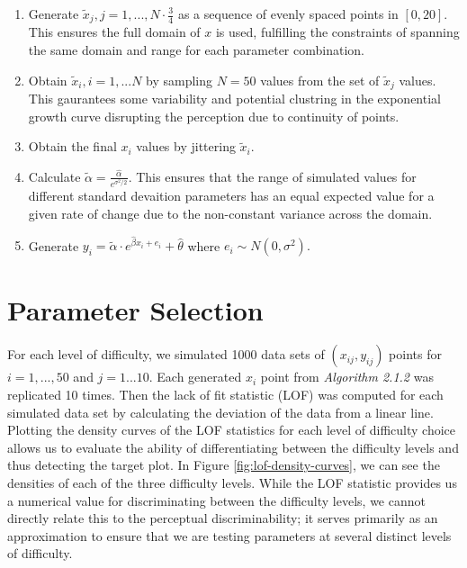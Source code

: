 \begin{appendix}
\begin{enumerate}
\def\labelenumi{\arabic{enumi}.}
\item
  Generate \(\tilde x_j, j = 1,..., N\cdot \frac{3}{4}\) as a sequence
  of evenly spaced points in \([0,20]\). This ensures the full domain of
  \(x\) is used, fulfilling the constraints of spanning the same domain
  and range for each parameter combination.
\item
  Obtain \(\tilde x_i, i = 1,...N\) by sampling \(N = 50\) values from
  the set of \(\tilde x_j\) values. This gaurantees some variability and
  potential clustring in the exponential growth curve disrupting the
  perception due to continuity of points.
\item
  Obtain the final \(x_i\) values by jittering \(\tilde x_i\).
\item
  Calculate \(\tilde\alpha = \frac{\hat\alpha}{e^{\sigma^2/2}}.\) This
  ensures that the range of simulated values for different standard
  devaition parameters has an equal expected value for a given rate of
  change due to the non-constant variance across the domain.
\item
  Generate
  \(y_i = \tilde\alpha\cdot e^{\hat\beta x_i + e_i}+\hat\theta\) where
  \(e_i\sim N(0,\sigma^2).\)
\end{enumerate}

\hypertarget{parameter-selection}{%
\section{\texorpdfstring{Parameter Selection
\label{app:parameters}}{Parameter Selection }}\label{parameter-selection}}

For each level of difficulty, we simulated 1000 data sets of
\((x_{ij}, y_{ij})\) points for \(i = 1,...,50\) and \(j = 1...10\).
Each generated \(x_i\) point from \textit{Algorithm 2.1.2} was
replicated 10 times. Then the lack of fit statistic (LOF) was computed
for each simulated data set by calculating the deviation of the data
from a linear line. Plotting the density curves of the LOF statistics
for each level of difficulty choice allows us to evaluate the ability of
differentiating between the difficulty levels and thus detecting the
target plot. In Figure \ref{fig:lof-density-curves}, we can see the
densities of each of the three difficulty levels. While the LOF
statistic provides us a numerical value for discriminating between the
difficulty levels, we cannot directly relate this to the perceptual
discriminability; it serves primarily as an approximation to ensure that
we are testing parameters at several distinct levels of difficulty.


\end{appendix}
